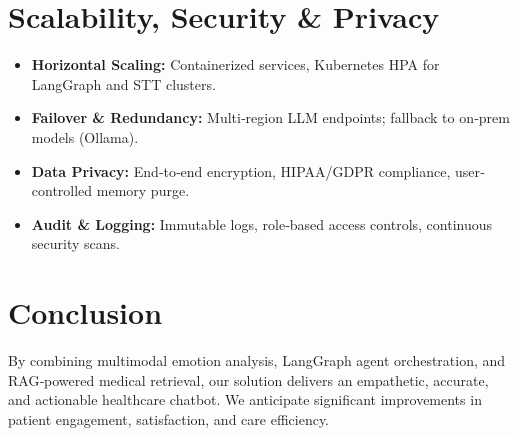 \documentclass[11pt,a4paper]{article}
\begin{document}
\section{Scalability, Security \& Privacy}
\begin{itemize}[left=0pt]
  \item \textbf{Horizontal Scaling:} Containerized services, Kubernetes HPA for LangGraph and STT clusters.
  \item \textbf{Failover \& Redundancy:} Multi‐region LLM endpoints; fallback to on‐prem models (Ollama).
  \item \textbf{Data Privacy:} End‐to‐end encryption, HIPAA/GDPR compliance, user‐controlled memory purge.
  \item \textbf{Audit \& Logging:} Immutable logs, role‐based access controls, continuous security scans.
\end{itemize}



\section{Conclusion}
By combining multimodal emotion analysis, LangGraph agent orchestration, and RAG‐powered medical retrieval, our solution delivers an empathetic, accurate, and actionable healthcare chatbot. We anticipate significant improvements in patient engagement, satisfaction, and care efficiency.
\end{document}
